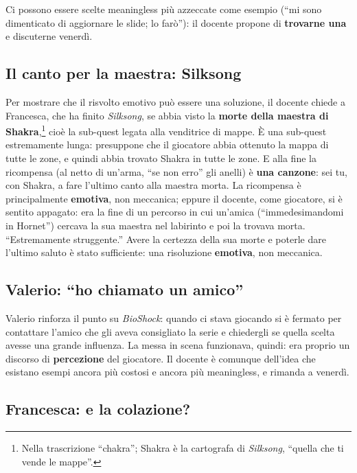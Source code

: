 Ci possono essere scelte meaningless più azzeccate come esempio (``mi sono
dimenticato di aggiornare le slide; lo farò''): il docente propone di
\textbf{trovarne una} e discuterne venerdì.

\subsection{Il canto per la maestra: Silksong}

Per mostrare che il risvolto emotivo può essere una soluzione, il docente
chiede a Francesca, che ha finito \emph{Silksong}, se abbia visto la
\textbf{morte della maestra di Shakra},\footnote{Nella trascrizione
``chakra''; Shakra è la cartografa di \emph{Silksong}, ``quella che ti vende
le mappe''.} cioè la sub-quest legata alla venditrice di mappe. È una
sub-quest estremamente lunga: presuppone che il giocatore abbia ottenuto la
mappa di tutte le zone, e quindi abbia trovato Shakra in tutte le zone. E
alla fine la ricompensa (al netto di un'arma, ``se non erro'' gli anelli) è
\textbf{una canzone}: sei tu, con Shakra, a fare l'ultimo canto alla maestra
morta. La ricompensa è principalmente \textbf{emotiva}, non meccanica; eppure
il docente, come giocatore, si è sentito appagato: era la fine di un percorso
in cui un'amica (``immedesimandomi in Hornet'') cercava la sua maestra nel
labirinto e poi la trovava morta. ``Estremamente struggente.'' Avere la
certezza della sua morte e poterle dare l'ultimo saluto è stato
sufficiente: una risoluzione \textbf{emotiva}, non meccanica.

\subsection{Valerio: ``ho chiamato un amico''}

Valerio rinforza il punto su \emph{BioShock}: quando ci stava giocando si è
fermato per contattare l'amico che gli aveva consigliato la serie e
chiedergli se quella scelta avesse una grande influenza. La messa in scena
funzionava, quindi: era proprio un discorso di \textbf{percezione} del
giocatore. Il docente è comunque dell'idea che esistano esempi ancora più
costosi e ancora più meaningless, e rimanda a venerdì.

\subsection{Francesca: e la colazione?}

